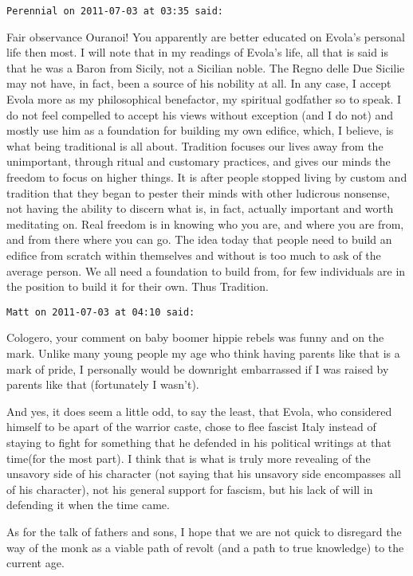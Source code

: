 \begin{footnotesize}
\begin{sffamily}
\hfill

\texttt{Perennial on 2011-07-03 at 03:35 said: }

Fair observance Ouranoi! You apparently are better educated on Evola's personal life then most. I will note that in my readings of Evola's life, all that is said is that he was a Baron from Sicily, not a Sicilian noble. The Regno delle Due Sicilie may not have, in fact, been a source of his nobility at all. In any case, I accept Evola more as my philosophical benefactor, my spiritual godfather so to speak. I do not feel compelled to accept his views without exception (and I do not) and mostly use him as a foundation for building my own edifice, which, I believe, is what being traditional is all about. Tradition focuses our lives away from the unimportant, through ritual and customary practices, and gives our minds the freedom to focus on higher things. It is after people stopped living by custom and tradition that they began to pester their minds with other ludicrous nonsense, not having the ability to discern what is, in fact, actually important and worth meditating on. Real freedom is in knowing who you are, and where you are from, and from there where you can go. The idea today that people need to build an edifice from scratch within themselves and without is too much to ask of the average person. We all need a foundation to build from, for few individuals are in the position to build it for their own. Thus Tradition.


\hfill

\texttt{Matt on 2011-07-03 at 04:10 said: }

Cologero, your comment on baby boomer hippie rebels was funny and on the mark. Unlike many young people my age who think having parents like that is a mark of pride, I personally would be downright embarrassed if I was raised by parents like that (fortunately I wasn't).

And yes, it does seem a little odd, to say the least, that Evola, who considered himself to be apart of the warrior caste, chose to flee fascist Italy instead of staying to fight for something that he defended in his political writings at that time(for the most part). I think that is what is truly more revealing of the unsavory side of his character (not saying that his unsavory side encompasses all of his character), not his general support for fascism, but his lack of will in defending it when the time came. 

As for the talk of fathers and sons, I hope that we are not quick to disregard the way of the monk as a viable path of revolt (and a path to true knowledge) to the current age.


\hfill


\end{sffamily}\end{footnotesize}
